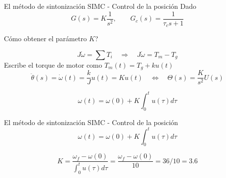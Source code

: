 \documentclass[presentation,aspectratio=169, usenames, dvipsnames]{beamer}
\begin{document}
\begin{frame}[label={sec:orgfb4d02a}]{El método de sintonización SIMC - Control de la posición}
Dado  \[G(s) = K \frac{1}{s^2},\qquad G_c(s) = \frac{1}{\tau_c s + 1} \]

\alert{Cómo obtener el parámetro \(K\)?}

\[J \dot{\omega} = \sum T_i \quad \Rightarrow \quad J\dot{\omega} = T_m - T_g \]
Escribe el torque de motor como \(T_m(t) = T_g + ku(t)\)
\[\ddot{\theta}(s) = \dot{\omega}(t) = \frac{k}{J}u(t) = K u(t)\quad \Leftrightarrow \quad \Theta(s) = \frac{K}{s^2}U(s)\]

\[ \omega(t) = \omega(0) + K \int_0^t u(\tau)d\tau \] 
\end{frame}




\begin{frame}[label={sec:org5b6bfee}]{El método de sintonización SIMC - Control de la posición}
\[ \omega(t) = \omega(0) + K \int_0^t u(\tau)d\tau \] 

   \begin{center}
   \end{center}

\[ K = \frac{\omega_f - \omega(0)}{\int_0^t u(\tau)d\tau} = \frac{\omega_f - \omega(0)}{10} = 36/10 = 3.6\]
\end{frame}
\end{document}
